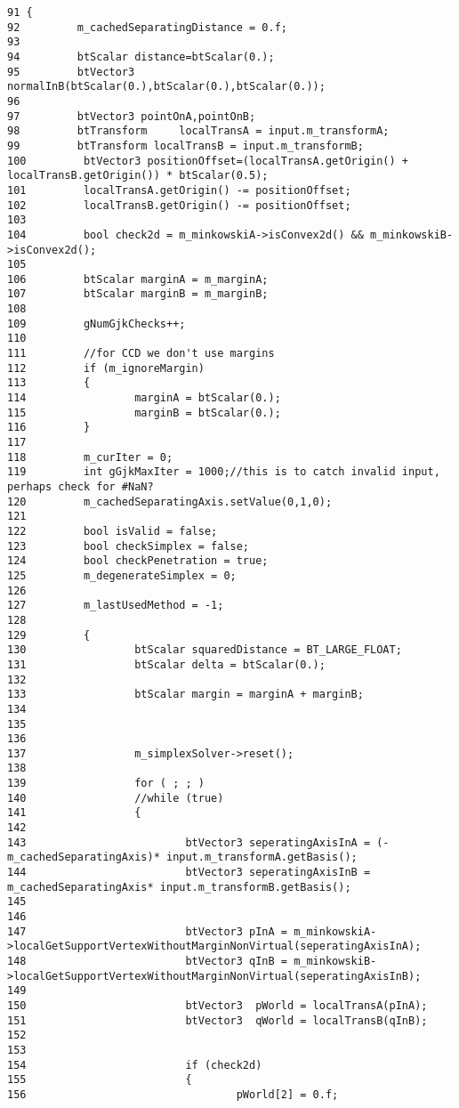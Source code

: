 \begin{Code}\begin{verbatim}91 {
92         m_cachedSeparatingDistance = 0.f;
93 
94         btScalar distance=btScalar(0.);
95         btVector3       normalInB(btScalar(0.),btScalar(0.),btScalar(0.));
96 
97         btVector3 pointOnA,pointOnB;
98         btTransform     localTransA = input.m_transformA;
99         btTransform localTransB = input.m_transformB;
100         btVector3 positionOffset=(localTransA.getOrigin() + localTransB.getOrigin()) * btScalar(0.5);
101         localTransA.getOrigin() -= positionOffset;
102         localTransB.getOrigin() -= positionOffset;
103 
104         bool check2d = m_minkowskiA->isConvex2d() && m_minkowskiB->isConvex2d();
105 
106         btScalar marginA = m_marginA;
107         btScalar marginB = m_marginB;
108 
109         gNumGjkChecks++;
110 
111         //for CCD we don't use margins
112         if (m_ignoreMargin)
113         {
114                 marginA = btScalar(0.);
115                 marginB = btScalar(0.);
116         }
117 
118         m_curIter = 0;
119         int gGjkMaxIter = 1000;//this is to catch invalid input, perhaps check for #NaN?
120         m_cachedSeparatingAxis.setValue(0,1,0);
121 
122         bool isValid = false;
123         bool checkSimplex = false;
124         bool checkPenetration = true;
125         m_degenerateSimplex = 0;
126 
127         m_lastUsedMethod = -1;
128 
129         {
130                 btScalar squaredDistance = BT_LARGE_FLOAT;
131                 btScalar delta = btScalar(0.);
132                 
133                 btScalar margin = marginA + marginB;
134                 
135                 
136 
137                 m_simplexSolver->reset();
138                 
139                 for ( ; ; )
140                 //while (true)
141                 {
142 
143                         btVector3 seperatingAxisInA = (-m_cachedSeparatingAxis)* input.m_transformA.getBasis();
144                         btVector3 seperatingAxisInB = m_cachedSeparatingAxis* input.m_transformB.getBasis();
145 
146 
147                         btVector3 pInA = m_minkowskiA->localGetSupportVertexWithoutMarginNonVirtual(seperatingAxisInA);
148                         btVector3 qInB = m_minkowskiB->localGetSupportVertexWithoutMarginNonVirtual(seperatingAxisInB);
149 
150                         btVector3  pWorld = localTransA(pInA);  
151                         btVector3  qWorld = localTransB(qInB);
152 
153 
154                         if (check2d)
155                         {
156                                 pWorld[2] = 0.f;

\end{verbatim}
\end{Code}
